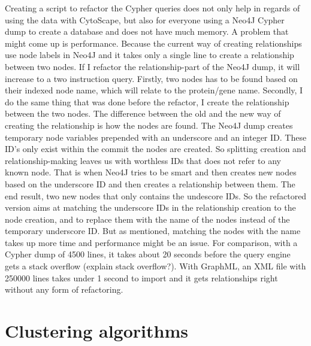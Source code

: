 \documentclass[UKenglish]{ifimaster}
\begin{document}
Creating a script to refactor the Cypher queries does not only help in regards of using the data with CytoScape, but
also for everyone using a Neo4J Cypher dump to create a database and does not have much memory. A problem that might
come up is performance. Because the current way of creating relationships use node labels in Neo4J and it takes only a
single line to create a relationship between two nodes. If I refactor the relationship-part of the Neo4J dump, it will
increase to a two instruction query. Firstly, two nodes has to be found based on their indexed node name, which will
relate to the protein/gene name. Secondly, I do the same thing that was done before the refactor, I create the
relationship between the two nodes. The difference between the old and the new way of creating the relationship is how
the nodes are found. The Neo4J dump creates temporary node variables prepended with an underscore and an integer ID.
These ID's only exist within the commit the nodes are created. So splitting creation and relationship-making leaves us
with worthless IDs that does not refer to any known node. That is when Neo4J tries to be smart and then creates new
nodes based on the underscore ID and then creates a relationship between them. The end result, two new nodes that only
contains the undescore IDs. So the refactored version aims at matching the underscore IDs in the relationship creation
to the node creation, and to replace them with the name of the nodes instead of the temporary underscore ID. But as
mentioned, matching the nodes with the name takes up more time and performance might be an issue. For comparison, with a
Cypher dump of 4500 lines, it takes about 20 seconds before the query engine gets a stack overflow (explain stack
overflow?). With GraphML, an XML file with 250000 lines takes under 1 second to import and it gets relationships right
without any form of refactoring.

\chapter{Clustering algorithms}
\end{document}
